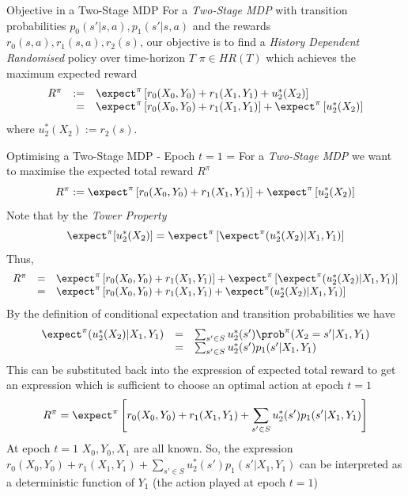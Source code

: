 \documentclass[11pt,a4paper]{article}
\begin{document}
  \begin{proposition}{Objective in a Two-Stage MDP}
    For a \textit{Two-Stage MDP} with transition probabilities $p_0(s'|s,a),p_1(s'|s,a)$ and the rewards $r_0(s,a),r_1(s,a),r_2(s)$, our objective is to find a \textit{History Dependent Randomised} policy over time-horizon $T$ $\pi\in HR(T)$ which achieves the maximum expected reward
    \[\begin{array}{rrl}
      R^\pi&:=&\expect^\pi\left[r_0(X_0,Y_0)+r_1(X_1,Y_1)+u_2^*(X_2)\right]\\
      &=&\expect^\pi\left[r_0(X_0,Y_0)+r_1(X_1,Y_1)\right]+\expect^\pi\left[u_2^*(X_2)\right]
    \end{array}\]
    where $u_2^*(X_2):=r_2(s)$.
  \end{proposition}

  \begin{proposition}{Optimising a Two-Stage MDP - Epoch $t=1$}
    \everymath={\displaystyle}
    For a \textit{Two-Stage MDP} we want to maximise the expected total reward $R^\pi$
    \[ R^\pi:=\expect^\pi\left[r_0(X_0,Y_0)+r_1(X_1,Y_1)\right]+\expect^\pi\left[u_2^*(X_2)\right] \]
    Note that by the \textit{Tower Property}
    \[ \expect^\pi[u_2^*(X_2)]=\expect^\pi\left[\expect^\pi(u_2^*(X_2)|X_1,Y_1)\right] \]
    Thus,
    \[\begin{array}{rcl}
      R^\pi&=&\expect^\pi\left[r_0(X_0,Y_0)+r_1(X_1,Y_1)\right]+\expect^\pi\left[\expect^\pi(u_2^*(X_2)|X_1,Y_1)\right]\\
      &=&\expect^\pi\left[r_0(X_0,Y_0)+r_1(X_1,Y_1)+\expect^\pi(u_2^*(X_2)|X_1,Y_1)\right]
    \end{array}\]
    By the definition of conditional expectation and transition probabilities we have
    \[\begin{array}{rcl}
      \expect^\pi(u_2^*(X_2)|X_1,Y_1)&=&\sum_{s'\in S}u_2^*(s')\prob^\pi(X_2=s'|X_1,Y_1)\\
      &=&\sum_{s'\in S}u_2^*(s')p_1(s'|X_1,Y_1)
    \end{array}\]
    This can be substituted back into the expression of expected total reward to get an expression which is sufficient to choose an optimal action at epoch $t=1$
    \[ R^\pi=\expect^\pi\left[r_0(X_0,Y_0)+r_1(X_1,Y_1)+\sum_{s'\in S}u_2^*(s')p_1(s'|X_1,Y_1)\right] \]
    At epoch ${t=1}$ ${X_0,Y_0,X_1}$ are all known. So, the expression ${r_0(X_0,Y_0)+r_1(X_1,Y_1)+\sum_{s'\in S}u_2^*(s')p_1(s'|X_1,Y_1)}$ can be interpreted as a deterministic function of $Y_1$ (the action played at epoch $t=1$)
    \[\begin{array}{rrl}

\end{array}\]
\end{proposition}
\end{document}
